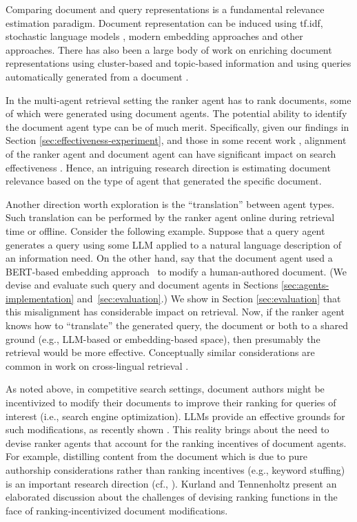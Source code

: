  Comparing document and query representations is a
fundamental relevance estimation paradigm. Document representation can
be induced using tf.idf, stochastic language models
\cite{Lafferty+Zhai:01a,Lavrenko+Croft:01a}, modern embedding
approaches \cite{e5,chen2024bge} and other approaches.  There has
also been a large body of work on enriching document representations
using cluster-based and topic-based information
\cite{Kurland+Lee:04a,Liu+Croft:04a,Wei+Croft:06a,Efron+al:12a}
and using queries automatically generated from a document
\cite{Nogueira+al:19a}.

In the multi-agent retrieval setting the ranker agent has to rank
documents, some of which were generated using document
agents. The potential ability to identify the document agent type can be of
much merit. Specifically, given our findings in Section \ref{sec:effectiveness-experiment}, and those in some recent work \cite{neural-llm-bias,dai2024cocktail}, alignment of the ranker agent and document agent can have significant impact on search effectiveness \cite{neural-llm-bias,dai2024cocktail}. Hence, an intriguing research direction is estimating document relevance based on the type of agent that generated the specific document.

Another direction worth exploration is the ``translation'' between
agent types. Such translation can be performed by the ranker agent
online during retrieval time or offline. Consider the following
example. Suppose that a query agent generates a query using some LLM
applied to a natural language description of an information need. On
the other hand, say that the document agent used a BERT-based
embedding approach~\cite{bert-transformer} to modify a human-authored document. (We devise and
evaluate such query and document agents in Sections \ref{sec:agents-implementation} and~\ref{sec:evaluation}.) We show in Section
\ref{sec:evaluation} that this misalignment has considerable impact on retrieval. Now, if the ranker agent knows how to ``translate''
the generated query, the document or both to a shared ground (e.g.,
LLM-based or embedding-based space), then presumably the retrieval would
be more effective. Conceptually similar considerations are common
in work on cross-lingual retrieval \cite{crossling}.

As noted above, in competitive search settings, document authors might be 
incentivized to modify their documents to improve their ranking for
queries of interest (i.e., search engine optimization). LLMs provide an effective grounds for such modifications, as recently shown \cite{Niv}. This reality brings about the need to devise ranker agents that account for the ranking incentives of document agents. For example, distilling content from the document which is due to pure authorship considerations rather than ranking incentives (e.g., keyword stuffing) is an important research direction (cf., \cite{Ziv-Ranker}). Kurland and Tennenholtz \cite{kurland_competitive_2022} present an elaborated discussion about the challenges of devising ranking functions in the face of ranking-incentivized document modifications.
